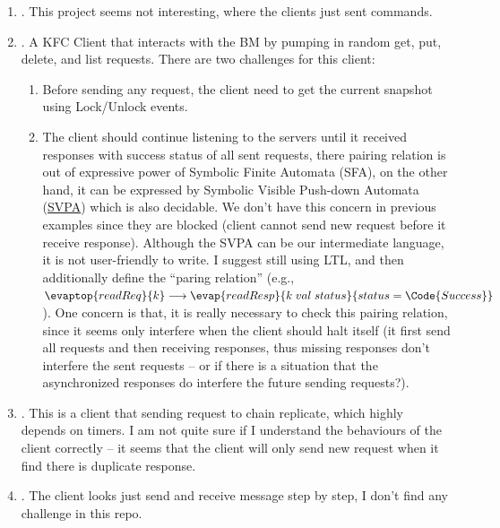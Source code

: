 \begin{enumerate}
    \item {}. This project seems not interesting, where the clients just sent commands.
    \item {}. A KFC Client that interacts with the BM by pumping in random get, put, delete, and list requests. There are two challenges for this client: 
    \begin{enumerate}
        \item Before sending any request, the client need to get the current snapshot using Lock/Unlock events.
        \item The client should continue listening to the servers until it received responses with success status of all sent requests, there pairing relation is out of expressive power of Symbolic Finite Automata (SFA), on the other hand, it can be expressed by Symbolic Visible Push-down Automata (\href{https://www.cis.upenn.edu/~alur/Cav14.pdf}{SVPA}) which is also decidable. We don't have this concern in previous examples since they are blocked (client cannot send new request before it receive response). Although the SVPA can be our intermediate language, it is not user-friendly to write. I suggest still using LTL, and then additionally define the ``paring relation'' (e.g., $ \evaptop{readReq}{k} \longrightarrow \evap{readResp}{k\;val\;status}{status = \Code{Success}}$). One concern is that, it is really necessary to check this pairing relation, since it seems only interfere when the client should halt itself (it first send all requests and then receiving responses, thus missing responses don't interfere the sent requests -- or if there is a situation that the asynchronized responses do interfere the future sending requests?).
    \end{enumerate}
    \item {}. This is a client that sending request to chain replicate, which highly depends on timers. I am not quite sure if I understand the behaviours of the client correctly -- it seems that the client will only send new request when it find there is duplicate response.
    \item {}. The client looks just send and receive message step by step, I don't find any challenge in this repo.
\end{enumerate}
